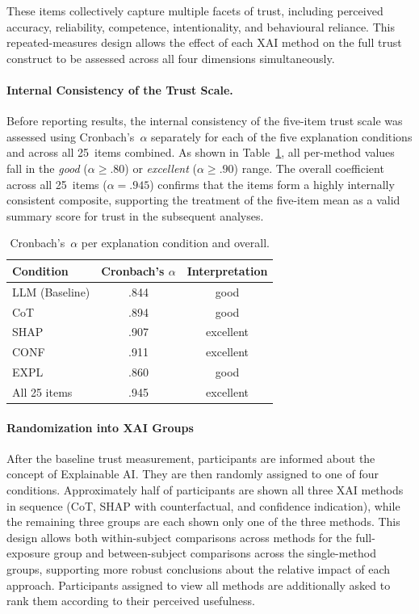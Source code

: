 These items collectively capture multiple facets of trust, including perceived accuracy, reliability, competence, intentionality, and behavioural reliance. This repeated-measures design allows the effect of each XAI method on the full trust construct to be assessed across all four dimensions simultaneously.

\paragraph{Internal Consistency of the Trust Scale.}
Before reporting results, the internal consistency of the five-item trust scale was assessed
using Cronbach's~$\alpha$ separately for each of the five explanation conditions and across
all 25~items combined. As shown in Table~\ref{tab:cronbach}, all per-method values fall in
the \emph{good} ($\alpha \geq .80$) or \emph{excellent} ($\alpha \geq .90$) range. The
overall coefficient across all 25~items ($\alpha = .945$) confirms that the items form a
highly internally consistent composite, supporting the treatment of the five-item mean as
a valid summary score for trust in the subsequent analyses.
 
\begin{table}[h]
\centering
\caption{Cronbach's~$\alpha$ per explanation condition and overall.}
\label{tab:cronbach}
\begin{tabular}{lcc}
\hline
\textbf{Condition} & \textbf{Cronbach's $\alpha$} & \textbf{Interpretation} \\
\hline
LLM (Baseline) & .844 & good       \\
CoT            & .894 & good       \\
SHAP           & .907 & excellent  \\
CONF           & .911 & excellent  \\
EXPL           & .860 & good       \\
\hline
All 25 items   & .945 & excellent  \\
\hline
\end{tabular}
\end{table}

\paragraph{Randomization into XAI Groups}
\label{sec:random_xai_group}

After the baseline trust measurement, participants are informed about the concept of Explainable AI. They are then randomly assigned to one of four conditions. Approximately half of participants are shown all three XAI methods in sequence (CoT, SHAP with counterfactual, and confidence indication), while the remaining three groups are each shown only one of the three methods. This design allows both within-subject comparisons across methods for the full-exposure group and between-subject comparisons across the single-method groups, supporting more robust conclusions about the relative impact of each approach. Participants assigned to view all methods are additionally asked to rank them according to their perceived usefulness.

